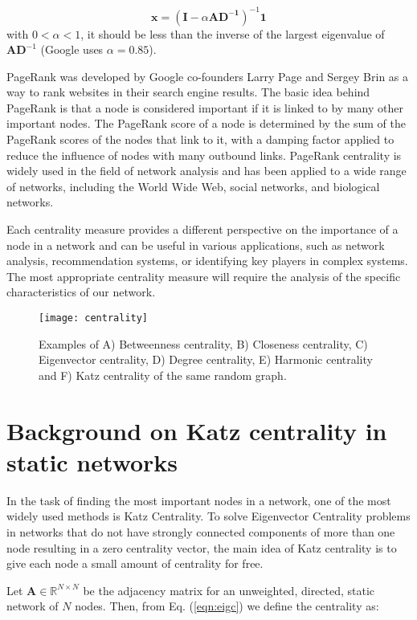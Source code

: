 \begin{equation}
\label{eqn:pr3}
    \mathbf{x} = (\mathbf{I} - \alpha\mathbf{AD^{-1}})^{-1} \mathbf{1}
\end{equation}
with $0<\alpha<1$, it should be less than the inverse of the largest eigenvalue of $\mathbf{AD}^{-1}$ (Google uses $\alpha = 0.85$).


PageRank was developed by Google co-founders Larry Page and Sergey Brin as a way to rank websites in their search engine results. The basic idea behind PageRank is that a node is considered important if it is linked to by many other important nodes. The PageRank score of a node is determined by the sum of the PageRank scores of the nodes that link to it, with a damping factor applied to reduce the influence of nodes with many outbound links. PageRank centrality is widely used in the field of network analysis and has been applied to a wide range of networks, including the World Wide Web, social networks, and biological networks.


Each centrality measure provides a different perspective on the importance of a node in a network and can be useful in various applications, such as network analysis, recommendation systems, or identifying key players in complex systems. The most appropriate centrality measure will require the analysis of the specific characteristics of our network.

\begin{figure}[htbp]\centering
	\texttt{[image: centrality]}
	\caption{Examples of A) Betweenness centrality, B) Closeness centrality, C) Eigenvector centrality, D) Degree centrality, E) Harmonic centrality and F) Katz centrality of the same random graph.}
	\label{centrality}
	\bigskip
\end{figure}

\section{Background on Katz centrality in static networks}
\label{sec:back}
In the task of finding the most important nodes in a network, one of the most widely used methods is Katz Centrality. To solve Eigenvector Centrality problems in networks that do not have strongly connected components of more than one node resulting in a zero centrality vector, the main idea of Katz centrality is to give each node a small amount of centrality for free. 

Let $\mathbf{A}\in\mathbb{R}^{N\times N}$ be the adjacency matrix for an unweighted, directed, static network of $N$ nodes. Then, from Eq. (\ref{eqn:eigc}) we define the centrality as:

